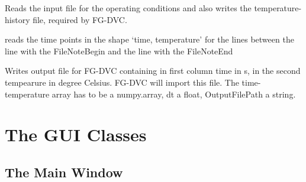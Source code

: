 \documentclass[letterpaper,10pt,english]{sphinxmanual}
\begin{document}
\begin{fulllineitems}
\label{InputOutputClasses:InformationFiles.OperCondInput}
Reads the input file for the operating conditions and also writes the temperature-history file, required by FG-DVC.

\begin{fulllineitems}
\label{InputOutputClasses:InformationFiles.OperCondInput.getTimePoints}
reads the time points in the shape `time, temperature' for the lines between the line with the FileNoteBegin and the line with the FileNoteEnd

\end{fulllineitems}


\begin{fulllineitems}
\label{InputOutputClasses:InformationFiles.OperCondInput.writeFGDVCtTHist}
Writes output file for FG-DVC containing in first column time in s, in the second tempearure in degree Celsius. FG-DVC will import this file. The time-temperature array has to be a numpy.array, dt a float, OutputFilePath a string.

\end{fulllineitems}


\end{fulllineitems}



\chapter{The GUI Classes}
\label{GUI:the-gui-classes}\label{GUI::doc}

\section{The Main Window}
\label{GUI:the-main-window}
\end{document}
